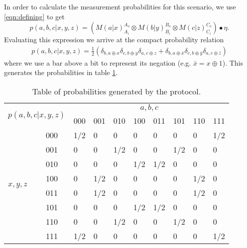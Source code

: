 \documentclass[aps,pra, twocolumn]{revtex4-1}
\begin{document}
In order to calculate the measurement probabilities for this scenario, we use \eqref{eqn:defining} to get
\begin{equation}
p(a,b,c|x,y,z)=(M(a|x)_{A_i}^{A_o} \otimes  M(b|y)_{B_i}^{B_o} \otimes  M(c|z)_{C_i}^{C_o})\bullet  \eta.
\end{equation}
Evaluating this expression we arrive at the compact probability relation
\begin{align}
p(a,b,c|x,y,z)=\frac{1}{2}\left(\delta_{b,a\oplus x}\delta_{c,b\oplus y}\delta_{a,c\oplus z}+\delta_{b,a\oplus \bar{x}}\delta_{c,b\oplus \bar{y}}\delta_{a,c\oplus \bar{z}}\right)
\end{align}
where we use a bar above a bit to represent its negation (e.g. $\bar{x}=x \oplus 1$). This generates the probabilities in table \ref{tab:prob}. 
\begin{table}[h]
\centering
\begin{tabular}{|l|l|l|l|l|l|l|l|l|l|}
\hline
\multicolumn{2}{|l|}{\multirow{2}{*}{$p(a,b,c|x,y,z)$}} & \multicolumn{8}{c|}{$a,b,c$}                    \\ \cline{3-10} 
\multicolumn{2}{|l|}{}                                & 000 & 001 & 010 & 100 & 011 & 101 & 110 & 111 \\ \hline
\multirow{8}{*}{$x,y,z$}              & 000             & 1/2 & 0   & 0   & 0   & 0   & 0   & 0   & 1/2 \\ \cline{2-10} 
                                    & 001             & 0   & 0   & 1/2 & 0   & 0   & 1/2 & 0   & 0   \\ \cline{2-10} 
                                    & 010             & 0   & 0   & 0   & 1/2 & 1/2 & 0   & 0   & 0   \\ \cline{2-10} 
                                    & 100             & 0   & 1/2 & 0   & 0   & 0   & 0   & 1/2 & 0   \\ \cline{2-10} 
                                    & 011             & 0   & 1/2 & 0   & 0   & 0   & 0   & 1/2 & 0   \\ \cline{2-10} 
                                    & 101             & 0   & 0   & 0   & 1/2 & 1/2 & 0   & 0   & 0   \\ \cline{2-10} 
                                    & 110             & 0   & 0   & 1/2 & 0   & 0   & 1/2 & 0   & 0   \\ \cline{2-10} 
                                    & 111             & 1/2 & 0   & 0   & 0   & 0   & 0   & 0   & 1/2 \\ \hline
\end{tabular}
\caption{Table of probabilities generated by the protocol.}
\label{tab:prob}
\end{table}
\end{document}
